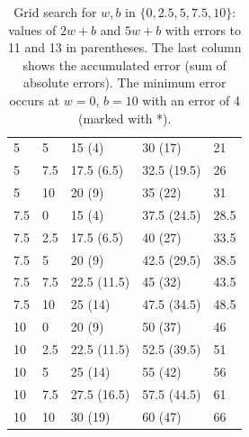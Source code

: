 \begin{table}[ht]
\begin{tabular}{p{}p{}p{}p{}p{}}
5   & 5   & 15 \hspace{0.5em} (4)    & 30 \hspace{0.5em} (17)    & 21 \\
5   & 7.5 & 17.5 \hspace{0.5em} (6.5) & 32.5 \hspace{0.5em} (19.5) & 26 \\
5   & 10  & 20 \hspace{0.5em} (9)    & 35 \hspace{0.5em} (22)    & 31 \\
7.5 & 0   & 15 \hspace{0.5em} (4)    & 37.5 \hspace{0.5em} (24.5) & 28.5 \\
7.5 & 2.5 & 17.5 \hspace{0.5em} (6.5) & 40 \hspace{0.5em} (27)     & 33.5 \\
7.5 & 5   & 20 \hspace{0.5em} (9)    & 42.5 \hspace{0.5em} (29.5) & 38.5 \\
7.5 & 7.5 & 22.5 \hspace{0.5em} (11.5) & 45 \hspace{0.5em} (32)    & 43.5 \\
7.5 & 10  & 25 \hspace{0.5em} (14)   & 47.5 \hspace{0.5em} (34.5) & 48.5 \\
10  & 0   & 20 \hspace{0.5em} (9)    & 50 \hspace{0.5em} (37)     & 46 \\
10  & 2.5 & 22.5 \hspace{0.5em} (11.5) & 52.5 \hspace{0.5em} (39.5) & 51 \\
10  & 5   & 25 \hspace{0.5em} (14)   & 55 \hspace{0.5em} (42)     & 56 \\
10  & 7.5 & 27.5 \hspace{0.5em} (16.5) & 57.5 \hspace{0.5em} (44.5) & 61 \\
10  & 10  & 30 \hspace{0.5em} (19)   & 60 \hspace{0.5em} (47)     & 66 \\
\bottomrule
\end{tabular}
\vspace{2em}
\caption{Grid search for $w, b$ in $\{0, 2.5, 5, 7.5, 10\}$: values of $2w + b$ and $5w + b$ with errors to 11 and 13 in parentheses. The last column shows the accumulated error (sum of absolute errors). 
The minimum error occurs at $w = 0$, $b = 10$ with an error of 4 (marked with *).}
\label{tab:gridsearch}
\end{table}



